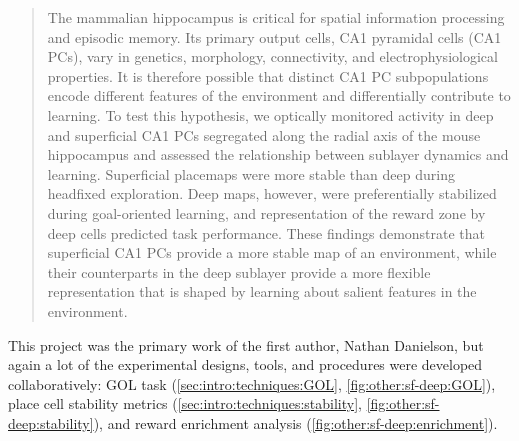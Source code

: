 \begin{quote}
The mammalian hippocampus is critical for spatial information processing and episodic memory. Its primary output cells, CA1 pyramidal cells (CA1 PCs), vary in genetics, morphology, connectivity, and electrophysiological properties. It is therefore possible that distinct CA1 PC subpopulations encode different features of the environment and differentially contribute to learning. To test this hypothesis, we optically monitored activity in deep and superficial CA1 PCs segregated along the radial axis of the mouse hippocampus and assessed the relationship between sublayer dynamics and learning. Superficial placemaps were more stable than deep during headfixed exploration. Deep maps, however, were preferentially stabilized during goal-oriented learning, and representation of the reward zone by deep cells predicted task performance. These findings demonstrate that superficial CA1 PCs provide a more stable map of an environment, while their counterparts in the deep sublayer provide a more flexible representation that is shaped by learning about salient features in the environment.
\end{quote}

This project was the primary work of the first author, Nathan Danielson, but again a lot of the experimental designs, tools, and procedures were developed collaboratively: \ac{GOL} task (\autoref{sec:intro:techniques:GOL}, \autoref{fig:other:sf-deep:GOL}), place cell stability metrics (\autoref{sec:intro:techniques:stability}, \autoref{fig:other:sf-deep:stability}), and reward enrichment analysis (\autoref{fig:other:sf-deep:enrichment}).

